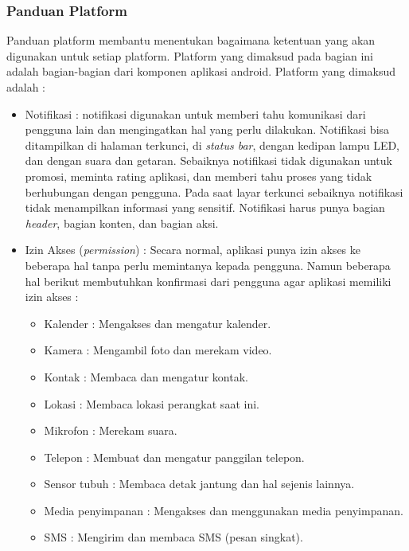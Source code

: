 \subsubsection{Panduan Platform}
Panduan platform membantu menentukan bagaimana ketentuan yang akan digunakan untuk setiap platform. Platform yang dimaksud pada bagian ini adalah bagian-bagian dari komponen aplikasi android. Platform yang dimaksud adalah :
\begin{itemize}
    \item Notifikasi : notifikasi digunakan untuk memberi tahu komunikasi dari pengguna lain dan mengingatkan hal yang perlu dilakukan. Notifikasi bisa ditampilkan di halaman terkunci, di \textit{status bar}, dengan kedipan lampu LED, dan dengan suara dan getaran. Sebaiknya notifikasi tidak digunakan untuk promosi, meminta rating aplikasi, dan memberi tahu proses yang tidak berhubungan dengan pengguna. Pada saat layar terkunci sebaiknya notifikasi tidak menampilkan informasi yang sensitif. Notifikasi harus punya bagian \textit{header}, bagian konten, dan bagian aksi. 
    \item Izin Akses (\textit{permission}) : Secara normal, aplikasi punya izin akses ke beberapa hal tanpa perlu memintanya kepada pengguna. Namun beberapa hal berikut membutuhkan konfirmasi dari pengguna agar aplikasi memiliki izin akses :
    \begin{itemize}
        \item Kalender : Mengakses dan mengatur kalender.
        \item Kamera : Mengambil foto dan merekam video.
        \item Kontak : Membaca dan mengatur kontak.
        \item Lokasi : Membaca lokasi perangkat saat ini.
        \item Mikrofon : Merekam suara.
        \item Telepon : Membuat dan mengatur panggilan telepon.
        \item Sensor tubuh : Membaca detak jantung dan hal sejenis lainnya.
        \item Media penyimpanan : Mengakses dan menggunakan media penyimpanan.
        \item SMS : Mengirim dan membaca SMS (pesan singkat).
    \end{itemize}
\end{itemize}

